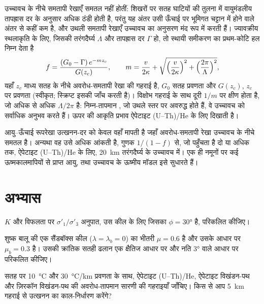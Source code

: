 उच्चावच के नीचे समतापी रेखाएँ समतल नहीं होतीं: शिखरों पर सतह
घाटियों की तुलना में वायुमंडलीय तापह्रास दर के अनुसार अधिक ठंडी होती है, परंतु यह अंतर उसी ऊँचाई पर
भूमिगत चट्टान में होने वाले अंतर से कहीं कम है, और उथली समतापी रेखाएँ
उच्चावच का अनुसरण मंद रूप में करती हैं। ज्यावक्रीय स्थलाकृति के लिए, जिसकी
तरंगदैर्घ्य $\Lambda$ और तापह्रास दर $\Gamma$ हो, तो
स्थायी समीकरण का प्रथम-कोटि हल निम्न देता है
\[
  f = \frac{(G_0 - \Gamma)\,e^{-mz_c}}{G(z_c)},\qquad
  m = \frac{v}{2\kappa} + \sqrt{\Bigl(\frac{v}{2\kappa}\Bigr)^2 +
  \Bigl(\frac{2\pi}{\Lambda}\Bigr)^2},
\]
यहाँ $z_c$ माध्य सतह के नीचे अवरोध-समतापी रेखा की गहराई है,
$G_0$ सतह प्रवणता और $G(z_c)$, $z_c$ पर प्रवणता (स्वीकृत;
स्क्रिप्ट इसकी जाँच करती है)। विक्षोभ गहराई के साथ
दूरी $1/m$ पर क्षीण होता है, जो अधिक से अधिक $\Lambda/2\pi$ है: निम्न-तापमान ,
जो उथले स्तर पर अवरुद्ध होते हैं, वे उच्चावच को सर्वाधिक अनुभव करते हैं। ऊपर की आकृति प्रभाव
ऐपेटाइट (U--Th)/He के लिए दिखाती है।

आयु--ऊँचाई रूपरेखा उत्खनन-दर को केवल वहाँ मापती है जहाँ
अवरोध-समतापी रेखा उच्चावच के नीचे समतल है। अन्यथा वह उसे अधिक आंकती है, गुणक $1/(1 - f)$ से, जो पहुँचता है
दो या अधिक तक, ऐपेटाइट (U--Th)/He के लिए, \qty{20}{km} तरंगदैर्घ्य के उच्चावच में।
एक ही नमूनों पर कई ऊष्मकालमापियों से प्राप्त आयु, तथा
उच्चावच के ऊष्मीय मॉडल इसे सुधारते हैं।

\section{अभ्यास}

\begin{exercise}[$\star$]\label{exo:b3:orogenic-wedges:1}
$K$ और विफलता पर $\sigma'_1/\sigma'_3$ अनुपात, उस कील के लिए जिसका
$\phi = \ang{30}$ है, परिकलित कीजिए।
\end{exercise}

\begin{exercise}[$\star$]\label{exo:b3:orogenic-wedges:2}
शुष्क बालू की एक सैंडबॉक्स कील ($\lambda = \lambda_b = 0$) का भीतरी $\mu = 0.6$ है
और उसके आधार पर $\mu_b = 0.3$ है। उसकी क्रांतिक सतही ढलान एक क्षैतिज आधार पर
और नति \ang{3} वाले आधार पर परिकलित कीजिए।
\end{exercise}

\begin{exercise}[$\star$]\label{exo:b3:orogenic-wedges:3}
सतह पर \qty{10}{\celsius} और \qty{30}{\celsius/km} प्रवणता के साथ,
ऐपेटाइट (U--Th)/He, ऐपेटाइट विखंडन-पथ और ज़िरकॉन विखंडन-पथ की अवरोध-तापमान सारणी की गहराइयाँ जाँचिए।
किस  से आप \qty{5}{km} गहराई से उत्खनन का
काल-निर्धारण करेंगे?
\end{exercise}

